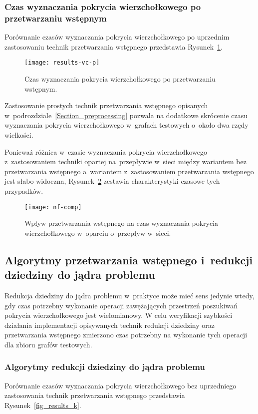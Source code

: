 \subsubsection{\textbf{Czas wyznaczania pokrycia wierzchołkowego po przetwarzaniu wstępnym}}

  Porównanie czasów wyznaczania pokrycia wierzchołkowego po uprzednim zastosowaniu technik przetwarzania wstępnego przedstawia Rysunek~\ref{fig_results_vc_p}.
  \begin{figure}
    \caption{Czas wyznaczania pokrycia wierzchołkowego po przetwarzaniu wstępnym.}
    \label{fig_results_vc_p}
    \centering
      \texttt{[image: results-vc-p]}
  \end{figure}
  Zastosowanie prostych technik przetwarzania wstępnego opisanych w~podrozdziale~\ref{Section_preprocessing} pozwala na dodatkowe skrócenie czasu wyznaczania pokrycia wierzchołkowego w~grafach testowych o~około dwa rzędy wielkości.

  Ponieważ różnica w~czasie wyznaczania pokrycia wierzchołkowego z~zastosowaniem techniki opartej na~przepływie w~sieci między wariantem bez przetwarzania wstępnego a~wariantem z~zastosowaniem przetwarzania wstępnego jest słabo widoczna, Rysunek~\ref{fig_nf_comp} zestawia charakterystyki czasowe tych przypadków.
  \begin{figure}
    \caption{Wpływ przetwarzania wstępnego na czas wyznaczania pokrycia wierzchołkowego w~oparciu o~przepływ w~sieci.}
    \label{fig_nf_comp}
    \centering
      \texttt{[image: nf-comp]}
  \end{figure}

\subsection{Algorytmy przetwarzania wstępnego i~redukcji dziedziny do jądra problemu}
  Redukcja dziedziny do jądra problemu w~praktyce może mieć sens jedynie wtedy, gdy czas potrzebny wykonanie operacji zawężających przestrzeń poszukiwań pokrycia wierzchołkowego jest wielomianowy.
  W celu weryfikacji szybkości działania implementacji opisywanych technik redukcji dziedziny oraz przetwarzania wstępnego zmierzono czas potrzebny na wykonanie tych operacji dla zbioru grafów testowych. 

\subsubsection{\textbf{Algorytmy redukcji dziedziny do jądra problemu}}
  Porównanie czasów wyznaczania pokrycia wierzchołkowego bez uprzedniego zastosowania technik przetwarzania wstępnego przedstawia Rysunek~\ref{fig_results_k}.

